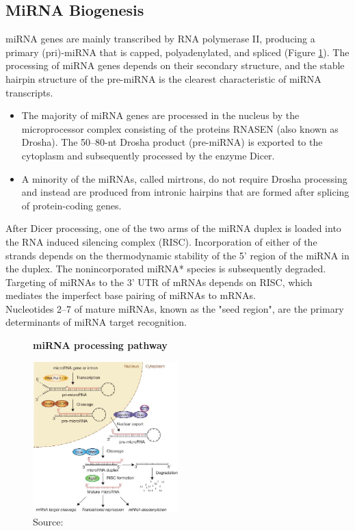 \subsection{MiRNA Biogenesis}
miRNA genes are mainly transcribed by RNA polymerase II, producing a primary (pri)-miRNA that is capped, polyadenylated, and spliced (Figure \ref{fig:miRNAprocessingpathway}). The processing of miRNA genes depends on their secondary structure, and the stable hairpin structure of the pre-miRNA is the clearest characteristic of miRNA transcripts.
\begin{itemize}
\item The majority of miRNA genes are processed in the nucleus by the microprocessor complex consisting of the proteins RNASEN (also known as Drosha). The 50–80-nt Drosha product (pre-miRNA) is exported to the cytoplasm and subsequently processed by the enzyme Dicer. 
\item A minority of the miRNAs, called mirtrons, do not require Drosha processing and instead are produced from intronic hairpins that are formed after splicing of protein-coding genes.
\end{itemize}
After Dicer processing, one of the two arms of the miRNA duplex is loaded into the RNA induced silencing complex (RISC). Incorporation of either of the strands depends on the thermodynamic stability of the 5' region of the miRNA in the duplex. The nonincorporated miRNA* species is subsequently degraded. Targeting of miRNAs to the 3' UTR of mRNAs depends on RISC, which mediates the imperfect base pairing of miRNAs to mRNAs. \\ Nucleotides 2–7 of mature miRNAs, known as the "seed region", are the primary determinants of miRNA target recognition.

\begin{figure}[ht!]
	  \centering
	      	\caption{\textbf{miRNA processing pathway}}
	      		  \label{fig:miRNAprocessingpathway}

    \includegraphics[width=0.5\textwidth]{background figures/ThelinearcanonicalpathwayofmicroRNAprocessing.jpg}
    	\caption*{Source: \cite{Winter2009}}
\end{figure}


